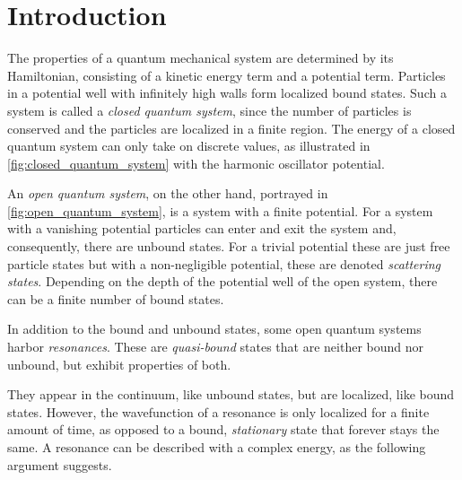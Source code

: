 \documentclass[../main/report.tex]{subfiles}
\begin{document}
\chapter{Introduction}
\label{cha:introduction}

The properties of a quantum mechanical system are determined by its Hamiltonian, consisting of a kinetic energy term and a potential term.
Particles in a potential well with infinitely high walls form localized bound states.
Such a system is called a \emph{closed quantum system}, since the number of particles is conserved and the particles are localized in a finite region. 
The energy of a closed quantum system can only take on discrete values, as illustrated in \cref{fig:closed_quantum_system} with the harmonic oscillator potential.

An \emph{open quantum system}, on the other hand, portrayed in \cref{fig:open_quantum_system}, is a system with a finite potential.
For a system with a vanishing potential particles can enter and exit the system and, consequently, there are unbound states. 
For a trivial potential these are just free particle states but with a non-negligible potential, these are denoted \emph{scattering states}.
Depending on the depth of the potential well of the open system, there can be a finite number of bound states.

In addition to the bound and unbound states, some open quantum systems harbor \emph{resonances}. 
These are \emph{quasi-bound} states that are neither bound nor unbound, but exhibit properties of both. 

They appear in the continuum, like unbound states, but are localized, like bound states.
However, the wavefunction of a resonance is only localized for a finite amount of time, as opposed to a bound, \emph{stationary} state that forever stays the same.
A resonance can be described with a complex energy, as the following argument suggests.
\end{document}
